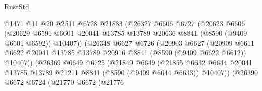 \begin{lexlean}{RustStd}
\begin{coremodule}
                                @1471
                                @11
                                @20
                                @2511
                                @6728
                                @21883
                                (@26327
                                  @6606
                                  @6727
                                  (@20623
                                    @6606
                                    (@20629
                                      @6591
                                      @6601
                                      @20041
                                      @13785
                                      @13789
                                      @20636
                                      @8841
                                      (@8590 (@9409 @6601 @6592))
                                      @10407))
                                  (@26348
                                    @6627
                                    @6726
                                    (@20903
                                      @6627
                                      (@20909
                                        @6611
                                        @6622
                                        @20041
                                        @13785
                                        @13789
                                        @20916
                                        @8841
                                        (@8590 (@9409 @6622 @6612))
                                        @10407))
                                    (@26369
                                      @6649
                                      @6725
                                      (@21849
                                        @6649
                                        (@21855
                                          @6632
                                          @6644
                                          @20041
                                          @13785
                                          @13789
                                          @21211
                                          @8841
                                          (@8590 (@9409 @6644 @6633))
                                          @10407))
                                      (@26390
                                        @6672
                                        @6724
                                        (@21770
                                          @6672
                                          (@21776

\end{coremodule}
\end{lexlean}
